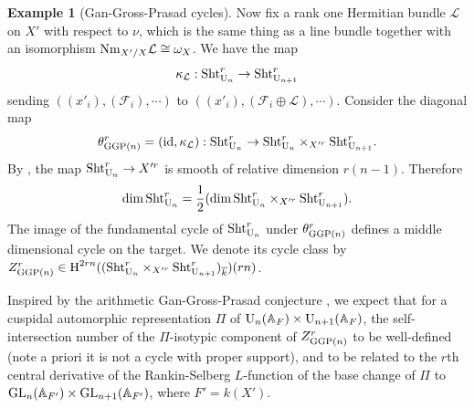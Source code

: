 \documentclass[11pt]{amsart}
\numberwithin{equation}{section}
\theoremstyle{plain}
\theoremstyle{definition}
\newtheorem{exam}[subsubsection]{Example}
\def\AA{\mathbb{A}}
\newcommand\cF{\mathcal{F}}
\newcommand\cL{\mathcal{L}}
\newcommand\id{\textup{id}}
\newcommand{\Nm}{\textup{Nm}}
\newcommand\Sht{\textup{Sht}}
\newcommand\GL{\textup{GL}}
\newcommand\Ug{\textup{U}}
\newcommand{\ov}{\overline}
\newcommand\op{\oplus}
\newcommand{\cohog}[2]{\textup{H}^{#1}({#2})}     %
\newcommand{\ka}{\kappa}
\renewcommand{\th}{\theta}
\newcommand{\om}{\omega}
\newcommand\GGP{\textup{GGP}}
\begin{document}
\begin{exam}[Gan-Gross-Prasad cycles]
Now fix a rank one Hermitian bundle $\cL$ on $X'$ with respect to $\nu$, which is the same thing as a line bundle together with an isomorphism $\Nm_{X'/X}\cL\cong \om_{X}$.   We have the map
\begin{equation*}
\ka_{\cL}:\Sht^{r}_{\Ug_{n}}\to \Sht^{r}_{\Ug_{n+1}} 
\end{equation*}
sending $((x'_{i}), (\cF_{i}), \cdots)$ to $((x'_{i}), (\cF_{i}\op\cL),\cdots)$. Consider the diagonal map
\begin{equation*}
\th^{r}_{\GGP(n)}=(\id,\ka_{\cL}): \Sht^{r}_{\Ug_{n}}\to \Sht^{r}_{\Ug_{n}}\times_{X'^{r}}\Sht^{r}_{\Ug_{n+1}}.
\end{equation*}
By \cite[Lemma 6.9(2)]{FYZ1}, the map $\Sht^{r}_{\Ug_{n}}\to X'^{r}$ is smooth of relative dimension $r(n-1)$. Therefore 
$$\dim\Sht^{r}_{\Ug_{n}}=\frac{1}{2}(\dim\Sht^{r}_{\Ug_{n}}\times_{X'^{r}}\Sht^{r}_{\Ug_{n+1}}).$$
The image of the fundamental cycle of $\Sht^{r}_{\Ug_{n}}$ under $\th^{r}_{\GGP(n)}$ defines a middle dimensional cycle on the target. We denote its cycle class by $Z^{r}_{\GGP(n)}\in \cohog{2rn}{(\Sht^{r}_{\Ug_{n}}\times_{X'^{r}}\Sht^{r}_{\Ug_{n+1}})_{\ov k}}(rn)$.

Inspired by the arithmetic Gan-Gross-Prasad conjecture \cite{GGP}, we expect that for a cuspidal automorphic representation $\Pi$ of $\Ug_{n}(\AA_{F})\times \Ug_{n+1}(\AA_{F})$, the self-intersection number of the $\Pi$-isotypic component of $Z^{r}_{\GGP(n)}$ to be well-defined (note a priori it is not a cycle with proper support), and to be related to the $r$th central derivative of the Rankin-Selberg  $L$-function of the base change of $\Pi$ to $\GL_{n}(\AA_{F'})\times\GL_{n+1}(\AA_{F'})$, where $F'=k(X')$. 

\end{exam}
\end{document}
